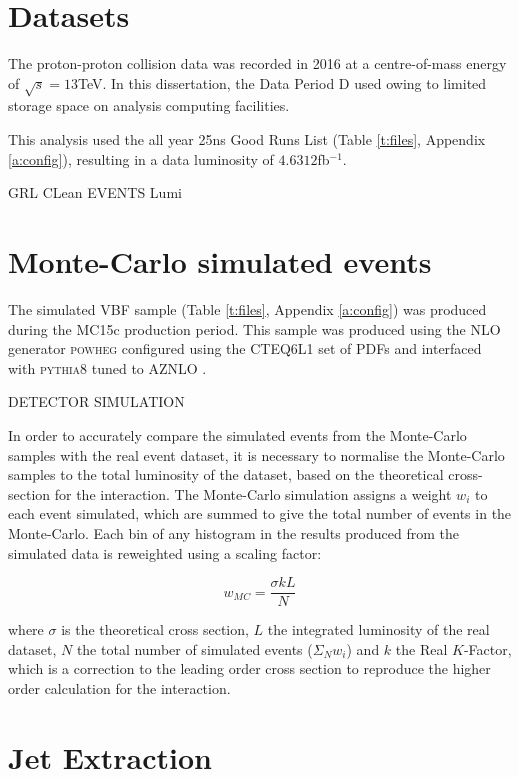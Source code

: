 	\section{Datasets}

	The proton-proton collision data was recorded in 2016 at a centre-of-mass energy of $\sqrt{s}=13$TeV. In this dissertation, the Data Period D used owing to limited storage space on analysis computing facilities.

	This analysis used the all year 25ns Good Runs List (Table \ref{t:files}, Appendix \ref{a:config}), resulting in a data luminosity of $4.6312$fb$^{-1}$.

	GRL
	CLean EVENTS
	Lumi

	\section{Monte-Carlo simulated events}

		 The simulated VBF sample (Table \ref{t:files}, Appendix \ref{a:config}) was produced during the MC15c production period. This sample was produced using the NLO generator \textsc{powheg} configured using the CTEQ6L1 \cite{CTEQ} set of PDFs and interfaced with \textsc{pythia8} tuned to AZNLO \cite{AZNLO}.

		 DETECTOR SIMULATION

		 In order to accurately compare the simulated events from the Monte-Carlo samples with the real event dataset, it is necessary to normalise the Monte-Carlo samples to the total luminosity of the dataset, based on the theoretical cross-section for the interaction. The Monte-Carlo simulation assigns a weight $w_i$ to each event simulated, which are summed to give the total number of events in the Monte-Carlo. Each bin of any histogram in the results produced from the simulated data is reweighted using a scaling factor:

		 \begin{equation}
		 w_{MC} = \frac{\sigma k L}{N}
		 \end{equation}

		 where $\sigma$ is the theoretical cross section, $L$ the integrated luminosity of the real dataset, $N$ the total number of simulated events ($\Sigma_N w_i$) and $k$ the Real $K$-Factor, which is a correction to the leading order cross section to reproduce the higher order calculation for the interaction.


	\section{Jet Extraction}

